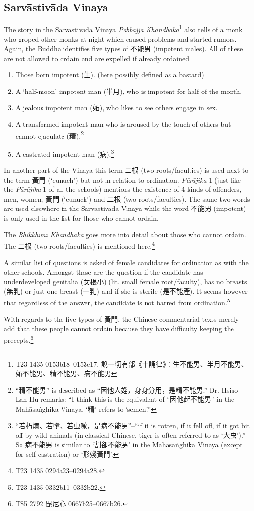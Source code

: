 \subsection{Sarvāstivāda Vinaya}
The story in the Sarvāstivāda Vinaya {\em Pabbajjā Khandhaka}\footnote{T23 1435 0153b18–0153c17. 說一切有部《十誦律》：生不能男、半月不能男、妬不能男、精不能男、病不能男} also tells of a monk who groped other monks at night which caused problems and started rumors. Again, the Buddha identifies five types of 不能男 (impotent males). All of these are not allowed to ordain and are expelled if already ordained:

\begin{enumerate}
\item Those born impotent (生). (here possibly defined as a bastard)
\item A `half-moon' impotent man (半月), who is impotent for half of the month.
\item A jealous impotent man (妬), who likes to see others engage in sex.
\item A transformed impotent man who is aroused by the touch of others but cannot ejaculate (精).\footnote{``精不能男'' is described as ``因他人婬，身身分用，是精不能男.'' Dr. Hsiao-Lan Hu remarks: ``I think this is the equivalent of ``因他起不能男'' in the Mahāsaṅghika Vinaya. `精' refers to `semen'.''}
\item A castrated impotent man (病).\footnote{``若朽爛、若墮、若虫噉，是病不能男''--``if it is rotten, if it fell off, if it got bit off by wild animals (in classical Chinese, tiger is often referred to as `大虫').'' So 病不能男 is similar to `割卻不能男' in the Mahāsaṅghika Vinaya (except for self-castration) or `形殘黃門'.}
\end{enumerate}

In another part of the Vinaya this term 二根 (two roots/faculties) is used next to the term 黃門 (`eunuch') but not in relation to ordination. {\em Pārājika} 1 (just like the {\em Pārājika} 1 of all the schools) mentions the existence of 4 kinds of offenders, men, women, 黃門 (`eunuch') and 二根 (two roots/faculties). The same two words are used elsewhere in the Sarvāstivāda Vinaya while the word 不能男 (impotent) is only used in the list for those who cannot ordain.

The {\em Bhikkhunī Khandhaka} goes more into detail about those who cannot ordain. The 二根 (two roots/faculties) is mentioned here.\footnote{T23 1435 0294a23–0294a28.} 

A similar list of questions is asked of female candidates for ordination as with the other schools. Amongst these are the question if the candidate has underdeveloped genitalia (女根小) (lit. small female root/faculty), has no breasts (無乳) or just one breast (一乳) and if she is sterile (是不能產). It seems however that regardless of the answer, the candidate is not barred from ordination.\footnote{T23 1435 0332b11–0332b22.}

With regards to the five types of 黃門, the Chinese commentarial texts merely add that these people cannot ordain because they have difficulty keeping the precepts.\footnote{T85 2792 毘尼心 0667b25–0667b26.}
